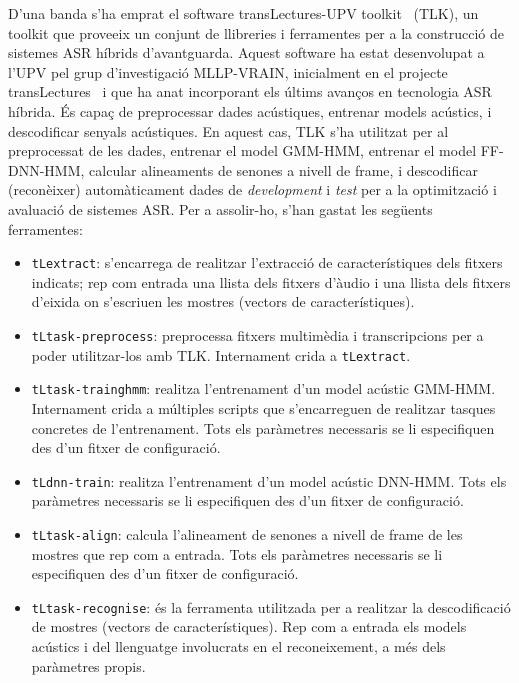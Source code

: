 D'una banda s'ha emprat el software transLectures-UPV toolkit~\cite{tlk} (TLK), un toolkit que proveeix un conjunt de llibreries i ferramentes per a la construcció de sistemes ASR híbrids d'avantguarda.
Aquest software ha estat desenvolupat a l'UPV pel grup d'investigació MLLP-VRAIN, inicialment en el projecte transLectures~\cite{translectures} i que ha anat incorporant els últims avanços en tecnologia ASR híbrida. És capaç de preprocessar dades acústiques, entrenar models acústics, i descodificar senyals acústiques. En aquest cas, TLK s'ha utilitzat per al preprocessat de les dades, entrenar el model GMM-HMM, entrenar el model FF-DNN-HMM, calcular alineaments de senones a nivell de frame, i descodificar (reconèixer) automàticament dades de \textit{development} i \textit{test} per a la optimització i avaluació de sistemes ASR.
Per a assolir-ho, s'han gastat les següents ferramentes:
\begin{itemize}
    \item \texttt{tLextract}: s'encarrega de realitzar l'extracció de característiques dels fitxers indicats; rep com entrada una llista dels fitxers d'àudio i una llista dels fitxers d'eixida on s'escriuen les mostres (vectors de característiques).
    \item \texttt{tLtask-preprocess}: preprocessa fitxers multimèdia i transcripcions per a poder utilitzar-los amb TLK. Internament crida a \texttt{tLextract}.
    \item \texttt{tLtask-trainghmm}: realitza l'entrenament d'un model acústic GMM-HMM. Internament crida a múltiples scripts que s'encarreguen de realitzar tasques concretes de l'entrenament. Tots els paràmetres necessaris se li especifiquen des d'un fitxer de configuració.
    \item \texttt{tLdnn-train}: realitza l'entrenament d'un model acústic DNN-HMM. Tots els paràmetres necessaris se li especifiquen des d'un fitxer de configuració.
    \item \texttt{tLtask-align}: calcula l'alineament de senones a nivell de frame de les mostres que rep com a entrada. Tots els paràmetres necessaris se li especifiquen des d'un fitxer de configuració.
    \item \texttt{tLtask-recognise}: és la ferramenta utilitzada per a realitzar la descodificació de mostres (vectors de característiques). Rep com a entrada els models acústics i del llenguatge involucrats en el reconeixement, a més dels paràmetres propis.
\end{itemize}
    
